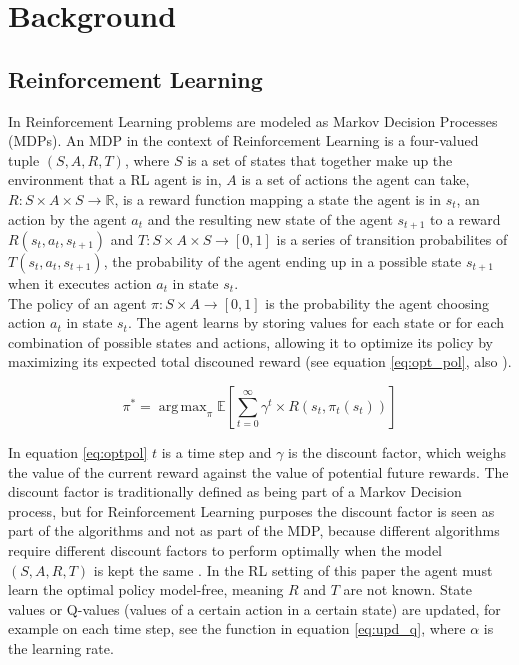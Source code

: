 
\section{Background}

\subsection{Reinforcement Learning}

In Reinforcement Learning problems are modeled as Markov Decision Processes (MDPs). An MDP in the context of Reinforcement Learning
is a four-valued tuple $(S,A,R,T)$, where $S$ is a set of states that together make up the environment that a RL agent is in,
 $A$ is a set of actions the agent can take, $R: S \times A \times S \rightarrow \mathbb{R}$, is a reward function mapping a state the agent is in $s_t$,
 an action by the agent $a_t$ and the resulting new state of the agent $s_{t+1}$ to a reward $R(s_t,a_t,s_{t+1})$
 and $T: S \times A \times S \rightarrow [0,1]$ is a series of transition probabilites of $T(s_t,a_t,s_{t+1})$, the probability of the agent
 ending up in a possible state $s_{t+1}$ when it executes action $a_t$ in state $s_t$. \\
 The policy of an agent $\pi: S \times A \rightarrow [0,1]$ is the probability the agent choosing action $a_t$ in state $s_t$. The agent learns by storing values for each
 state or for each combination of possible states and actions, allowing it to optimize its policy by maximizing its expected total discouned reward
 (see equation \ref{eq:opt_pol}, also \cite{zimmer2016neural}).

\begin{equation}
\label{eq:opt_pol}
\pi^* = \operatorname{arg\,max}_{\pi} \mathbb{E}\left [ \sum_{t = 0}^{\infty}\gamma^{t} \times R(s_t,\pi_t(s_t))\right ]
\end{equation}

In equation \eqref{eq:optpol} $t$ is a time step and $\gamma$ is the discount factor, which weighs the value of the current reward against the value of potential future rewards.
The discount factor is traditionally defined as being part of a Markov Decision process, but for Reinforcement Learning purposes the discount factor is seen as part
of the algorithms and not as part of the MDP, because different algorithms require different discount factors to perform optimally when the model
$(S,A,R,T)$ is kept the same \cite{van2007reinforcement}. In the RL setting of this paper the agent must learn the optimal policy model-free, meaning $R$ and $T$ are not known.
State values or Q-values (values of a certain action in a certain state) are updated, for example on each time step, see the function in equation \ref{eq:upd_q}, where $\alpha$ is the learning rate.

